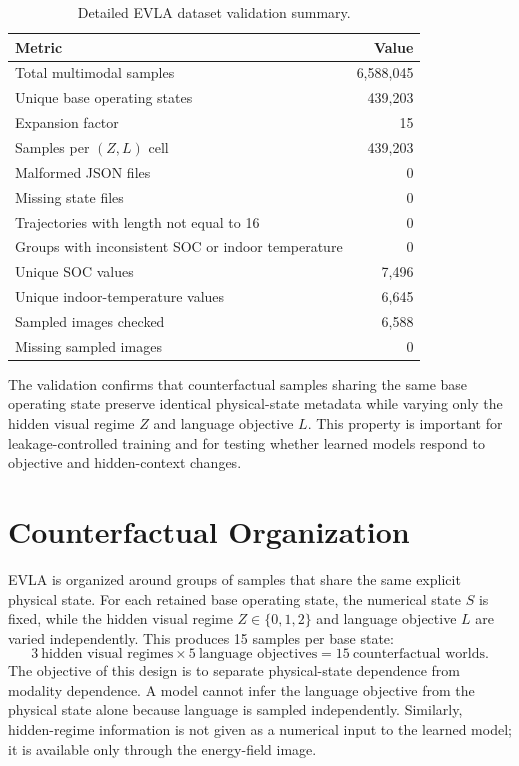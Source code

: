 \documentclass[preprint,12pt]{elsarticle}
\begin{document}
\begin{table}[t]
\centering
\caption{Detailed EVLA dataset validation summary.}
\label{tab:supp_validation}
\begin{tabular}{lr}
\toprule
Metric & Value \\
\midrule
Total multimodal samples & 6,588,045 \\
Unique base operating states & 439,203 \\
Expansion factor & 15 \\
Samples per \((Z,L)\) cell & 439,203 \\
Malformed JSON files & 0 \\
Missing state files & 0 \\
Trajectories with length not equal to 16 & 0 \\
Groups with inconsistent SOC or indoor temperature & 0 \\
Unique SOC values & 7,496 \\
Unique indoor-temperature values & 6,645 \\
Sampled images checked & 6,588 \\
Missing sampled images & 0 \\
\bottomrule
\end{tabular}
\end{table}

The validation confirms that counterfactual samples sharing the same base operating state preserve identical physical-state metadata while varying only the hidden visual regime \(Z\) and language objective \(L\). This property is important for leakage-controlled training and for testing whether learned models respond to objective and hidden-context changes.

\section{Counterfactual Organization}
\label{supp:counterfactual_organization}

EVLA is organized around groups of samples that share the same explicit physical state. For each retained base operating state, the numerical state \(S\) is fixed, while the hidden visual regime \(Z\in\{0,1,2\}\) and language objective \(L\) are varied independently. This produces 15 samples per base state:
\[
    3 \ \text{hidden visual regimes}
    \times
    5 \ \text{language objectives}
    =
    15 \ \text{counterfactual worlds}.
\]
The objective of this design is to separate physical-state dependence from modality dependence. A model cannot infer the language objective from the physical state alone because language is sampled independently. Similarly, hidden-regime information is not given as a numerical input to the learned model; it is available only through the energy-field image.
\end{document}
